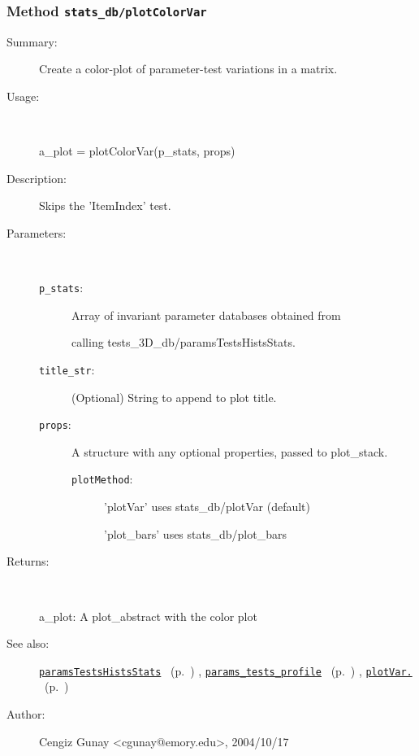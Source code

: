 \subsubsection[Method \texttt{plotColorVar}]{Method \texttt{stats\_db/plotColorVar}}%
%
\label{ref_stats_db__plotColorVar}%
\hypertarget{ref_stats_db__plotColorVar}{}%
\begin{description}
\item[Summary:]Create a color-plot of parameter-test variations in a matrix.
%
\item[Usage:]~%
\begin{lyxcode}%
a\_plot = plotColorVar(p\_stats, props)
%
\end{lyxcode}%
%
\item[Description:]%
Skips the 'ItemIndex' test.
\item[Parameters:]~
\begin{description}%
\item[\texttt{p\_stats}:]
 Array of invariant parameter databases obtained from

calling tests\_3D\_db/paramsTestsHistsStats.
\item[\texttt{title\_str}:]
 (Optional) String to append to plot title.
\item[\texttt{props}:]
 A structure with any optional properties, passed to plot\_stack.
\begin{description}%
\item[\texttt{plotMethod}:]
 'plotVar' uses stats\_db/plotVar (default)

'plot\_bars' uses stats\_db/plot\_bars
\end{description}%
\end{description}%
%
\item[Returns:
]~

	a\_plot: A plot\_abstract with the color plot
%
%
\item[See also:]%
\hyperlink{ref_paramsTestsHistsStats}{\texttt{paramsTestsHistsStats}}%
\ (p.~\pageref{ref_paramsTestsHistsStats})%
%
, \hyperlink{ref_params_tests_profile}{\texttt{params\_tests\_profile}}%
\ (p.~\pageref{ref_params_tests_profile})%
%
, \hyperlink{ref_plotVar.}{\texttt{plotVar.}}%
\ (p.~\pageref{ref_plotVar.})%
%
%
\item[Author:]%
Cengiz Gunay <cgunay@emory.edu>, 2004/10/17
%
\end{description}
\methodline%
